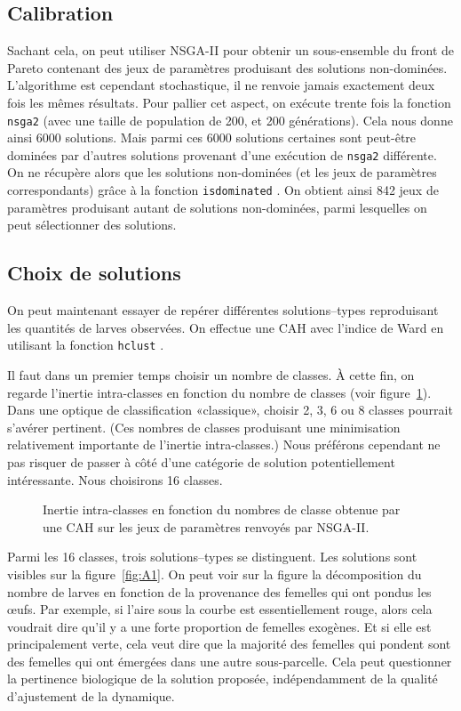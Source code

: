 \subsection{Calibration}

Sachant cela, on peut utiliser NSGA-II pour obtenir un sous-ensemble du front de Pareto contenant des jeux de paramètres produisant des solutions non-dominées.
L'algorithme est cependant stochastique, il ne renvoie jamais exactement deux fois les mêmes résultats.
Pour pallier cet aspect, on exécute trente fois la fonction \texttt{nsga2} \citep{nsga} (avec une taille de population de 200, et 200 générations).
Cela nous donne ainsi 6000 solutions. Mais parmi ces 6000 solutions certaines sont peut-être dominées par d'autres solutions provenant d'une exécution de \texttt{nsga2} différente.
On ne récupère alors que les solutions non-dominées (et les jeux de paramètres correspondants) grâce à la fonction \texttt{is\textunderscore dominated} \citep{emoa}.
On obtient ainsi 842 jeux de paramètres produisant autant de solutions non-dominées, parmi lesquelles on peut sélectionner des solutions.

\subsection{Choix de solutions}

On peut maintenant essayer de repérer différentes solutions--types reproduisant les quantités de larves observées.
On effectue une CAH avec l'indice de Ward en utilisant la fonction \texttt{hclust} \citep{R}.

Il faut dans un premier temps choisir un nombre de classes.
À cette fin, on regarde l'inertie intra-classes en fonction du nombre de classes (voir figure~\ref{fig:caha}).
Dans une optique de classification «classique», choisir 2, 3, 6 ou 8 classes pourrait s'avérer pertinent.
(Ces nombres de classes produisant une minimisation relativement importante de l'inertie intra-classes.)
Nous préférons cependant ne pas risquer de passer à côté d'une catégorie de solution potentiellement intéressante.
Nous choisirons 16 classes.

\begin{figure}[ht]
 \centering
 \caption{Inertie intra-classes en fonction du nombres de classe obtenue par une CAH sur les jeux de paramètres renvoyés par NSGA-II.}
 \label{fig:caha}
\end{figure}


Parmi les 16 classes, trois solutions--types se distinguent.
Les solutions sont visibles sur la figure~\ref{fig:A1}.
On peut voir sur la figure la décomposition du nombre de larves en fonction de la provenance des femelles qui ont pondus les œufs.
Par exemple, si l'aire sous la courbe est essentiellement rouge, alors cela voudrait dire qu'il y a une forte proportion de femelles exogènes.
Et si elle est principalement verte, cela veut dire que la majorité des femelles qui pondent sont des femelles qui ont émergées dans une autre sous-parcelle. 
Cela peut questionner la pertinence biologique de la solution proposée, indépendamment de la qualité d'ajustement de la dynamique.

